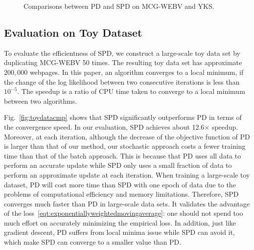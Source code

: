\documentclass[runningheads]{llncs}
\begin{document}
\begin{figure}[t!]
\begin{minipage}{\textwidth}
{\label{fig:accuracycmponyks}
}
\end{minipage}
\caption{Comparisons between PD and SPD on MCG-WEBV and YKS.}
\label{fig:cmp-three-metric-mcg-yks}
\end{figure}

\subsection{Evaluation on Toy Dataset}
To evaluate the efficientness of SPD, we construct a large-scale toy data set by duplicating MCG-WEBV 50 times. The resulting toy data set has approximate $200,000$ webpages. In this paper, an algorithm converges to a local minimum, if the change of the log likelihood between two consecutive iterations is less than $10^{-5}$. The speedup is a ratio of CPU time taken to converge to a local minimum between two algorithms.

Fig.~\ref{fig:toydatacmp} shows that SPD significantly outperforms PD in terms of the convergence speed. In our evaluation, SPD achieves about 12.6$\times$ speedup. Moreover, at each iteration, although the decrease of the objective function of PD is larger than that of our method, our stochastic approach costs a fewer training time than that of the batch approach. This is because that PD uses all data to perform an accurate update while SPD only uses a small fraction of data to perform an approximate update at each iteration. When training a large-scale toy dataset, PD will cost more time than SPD with one epoch of data due to the problems of computational efficiency and memory limitations. Therefore, SPD converges much faster than PD in large-scale data sets. It validates the advantage of the loss~\eqref{eqt:exponentiallyweightedmovingaverage}: one should not spend too much effort on accurately minimizing the empirical loss. In addition, just like gradient descent, PD suffers from local minima issue while SPD can avoid it, which make SPD can converge to a smaller value than PD.
\end{document}

